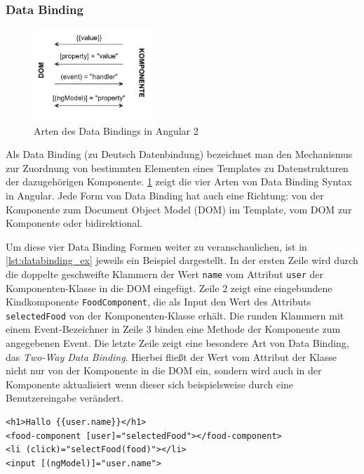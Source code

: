 \subsubsection{Data Binding}
\begin{figure}
	\centering
	\vspace{-20pt}
	\includegraphics[width=0.4\textwidth]{bilder/kap5/databinding}
	\vspace{-20pt}
	\caption{Arten des Data Bindings in Angular 2}
	\label{fig:databinding}
\end{figure}
Als Data Binding (zu Deutsch Datenbindung) bezeichnet man den Mechanismus zur Zuordnung von bestimmten Elementen eines Templates zu Datenstrukturen der dazugehörigen Komponente.
\cref{fig:databinding} zeigt die vier Arten von Data Binding Syntax in Angular.
Jede Form von Data Binding hat auch eine Richtung: von der Komponente zum Document Object Model (\acs{DOM}) im Template, vom \acs{DOM} zur Komponente oder bidirektional.

\newpage
Um diese vier Data Binding Formen weiter zu veranschaulichen, ist in \cref{lst:databinding_ex} jeweils ein Beispiel dargestellt. In der ersten Zeile wird durch die doppelte geschweifte Klammern der Wert \texttt{name} vom Attribut \texttt{user} der Komponenten-Klasse in die \acs{DOM} eingefügt.
Zeile 2 zeigt eine eingebundene Kindkomponente \texttt{FoodComponent}, die als Input den Wert des Attributs \texttt{selectedFood} von der Komponenten-Klasse erhält.
Die runden Klammern mit einem Event-Bezeichner in Zeile 3 binden eine Methode der Komponente zum angegebenen Event.
Die letzte Zeile zeigt eine besondere Art von Data Binding, das \textit{Two-Way Data Binding}.
Hierbei fließt der Wert vom Attribut der Klasse nicht nur von der Komponente in die \acs{DOM} ein, sondern wird auch in der Komponente aktualisiert wenn dieser sich beispielsweise durch eine Benutzereingabe verändert.
\\
\begin{lstlisting}[language=HTML5,caption={Beispiele zu den Data Binding Arten},label=lst:databinding_ex]
<h1>Hallo {{user.name}}</h1>
<food-component [user]="selectedFood"></food-component>
<li (click)="selectFood(food)"></li>
<input [(ngModel)]="user.name">
\end{lstlisting}

